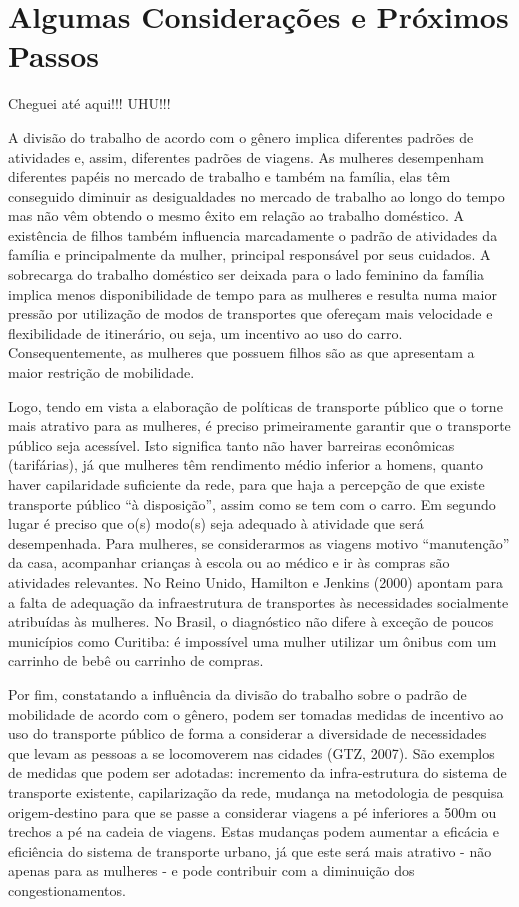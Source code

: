 \chapter{Algumas Considerações e Próximos Passos}\label{chap:considfinais}

Cheguei até aqui!!! UHU!!!


A divisão do trabalho de acordo com o gênero implica diferentes padrões de atividades e, assim, diferentes padrões de viagens. As mulheres desempenham diferentes papéis no mercado de trabalho e também na família, elas têm conseguido diminuir as desigualdades no mercado de trabalho ao longo do tempo mas não vêm obtendo o mesmo êxito em relação ao trabalho doméstico. A existência de filhos também influencia marcadamente o padrão de atividades da família e principalmente da mulher, principal responsável por seus cuidados. A sobrecarga do trabalho doméstico ser deixada para o lado feminino da família implica menos disponibilidade de tempo para as mulheres e resulta numa maior pressão por utilização de modos de transportes que ofereçam mais velocidade e flexibilidade de itinerário, ou seja, um incentivo ao uso do carro. Consequentemente, as mulheres que possuem filhos são as que apresentam a maior restrição de mobilidade.

Logo, tendo em vista a elaboração de políticas de transporte público que o torne mais atrativo para as mulheres, é preciso primeiramente garantir que o transporte público seja acessível. Isto significa tanto não haver barreiras econômicas (tarifárias), já que mulheres têm rendimento médio inferior a homens, quanto haver capilaridade suficiente da rede, para que haja a percepção de que existe transporte público ``à disposição'', assim como se tem com o carro. Em segundo lugar é preciso que o(s) modo(s) seja adequado à atividade que será desempenhada. Para mulheres, se considerarmos as viagens motivo ``manutenção'' da casa, acompanhar crianças à escola ou ao médico e ir às compras são atividades relevantes. No Reino Unido, Hamilton e Jenkins (2000) apontam para a falta de adequação da infraestrutura de transportes às necessidades socialmente atribuídas às mulheres. No Brasil, o diagnóstico não difere à exceção de poucos municípios como Curitiba: é impossível uma mulher utilizar um ônibus com um carrinho de bebê ou carrinho de compras. 

Por fim, constatando a influência da divisão do trabalho sobre o padrão de mobilidade de acordo com o gênero, podem ser tomadas medidas de incentivo ao uso do transporte público de forma a considerar a diversidade de necessidades que levam as pessoas a se locomoverem nas cidades (GTZ, 2007). São exemplos de medidas que podem ser adotadas: incremento da infra-estrutura do sistema de transporte existente, capilarização da rede, mudança na metodologia de pesquisa origem-destino para que se passe a considerar viagens a pé inferiores a 500m ou trechos a pé na cadeia de viagens. Estas mudanças podem aumentar a eficácia e eficiência do sistema de transporte urbano, já que este será mais atrativo - não apenas para as mulheres - e pode contribuir com a diminuição dos congestionamentos.

